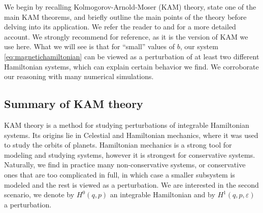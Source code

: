 
We begin by recalling Kolmogorov-Arnold-Moser (KAM) theory, state one of the main KAM theorems, and briefly outline the main points of the theory before delving into its application. We refer the reader to \cite{Knauf_2018} and \cite{Seri_2022} for a more detailed account. We strongly recommend \cite{poschel82} for reference, as it is the version of KAM we use here. What we will see is that for ``small'' values of $b$, our system \eqref{eq:magnetichamiltonian} can be viewed as a perturbation of at least two different Hamiltonian systems, which can explain certain behavior we find. We corroborate our reasoning with many numerical simulations.

\subsection{Summary of KAM theory}
KAM theory is a method for studying perturbations of integrable Hamiltonian systems. Its origins lie in Celestial and Hamiltonian mechanics, where it was used to study the orbits of planets. Hamiltonian mechanics is a strong tool for modeling and studying systems, however it is strongest for conservative systems. Naturally, we find in practice many non-conservative systems, or conservative ones that are too complicated in full, in which case a smaller subsystem is modeled and the rest is viewed as a perturbation. We are interested in the second scenario, we denote by $H^0(q,p)$ an integrable Hamiltonian and by $H^1(q,p,\varepsilon)$ a perturbation. 

